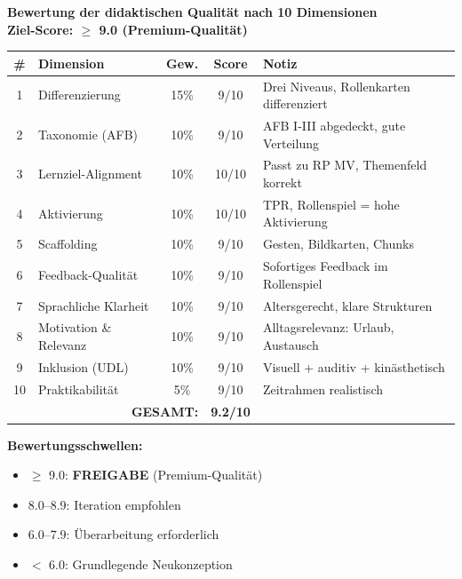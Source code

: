 \documentclass[11pt,a4paper]{article}
\begin{document}
\begin{scorebox}
\textbf{Bewertung der didaktischen Qualität nach 10 Dimensionen}\\
\textbf{Ziel-Score: $\geq$ 9.0 (Premium-Qualität)}

\vspace{1em}
\begin{tabular}{|c|l|c|c|p{4.5cm}|}
\hline
\textbf{\#} & \textbf{Dimension} & \textbf{Gew.} & \textbf{Score} & \textbf{Notiz} \\
\hline
1 & Differenzierung & 15\% & 9/10 & Drei Niveaus, Rollenkarten differenziert \\
\hline
2 & Taxonomie (AFB) & 10\% & 9/10 & AFB I-III abgedeckt, gute Verteilung \\
\hline
3 & Lernziel-Alignment & 10\% & 10/10 & Passt zu RP MV, Themenfeld korrekt \\
\hline
4 & Aktivierung & 10\% & 10/10 & TPR, Rollenspiel = hohe Aktivierung \\
\hline
5 & Scaffolding & 10\% & 9/10 & Gesten, Bildkarten, Chunks \\
\hline
6 & Feedback-Qualität & 10\% & 9/10 & Sofortiges Feedback im Rollenspiel \\
\hline
7 & Sprachliche Klarheit & 10\% & 9/10 & Altersgerecht, klare Strukturen \\
\hline
8 & Motivation \& Relevanz & 10\% & 9/10 & Alltagsrelevanz: Urlaub, Austausch \\
\hline
9 & Inklusion (UDL) & 10\% & 9/10 & Visuell + auditiv + kinästhetisch \\
\hline
10 & Praktikabilität & 5\% & 9/10 & Zeitrahmen realistisch \\
\hline
\multicolumn{3}{|r|}{\textbf{GESAMT:}} & \textbf{9.2/10} & \\
\hline
\end{tabular}

\vspace{1em}
\textbf{Bewertungsschwellen:}
\begin{itemize}
    \item[\checkmark] \textcolor{successgreen}{$\geq$ 9.0: \textbf{FREIGABE} (Premium-Qualität)}
    \item[$\Box$] \textcolor{warningorange}{8.0--8.9: Iteration empfohlen}
    \item[$\Box$] 6.0--7.9: Überarbeitung erforderlich
    \item[$\Box$] $<$ 6.0: Grundlegende Neukonzeption
\end{itemize}
\end{scorebox}
\end{document}
